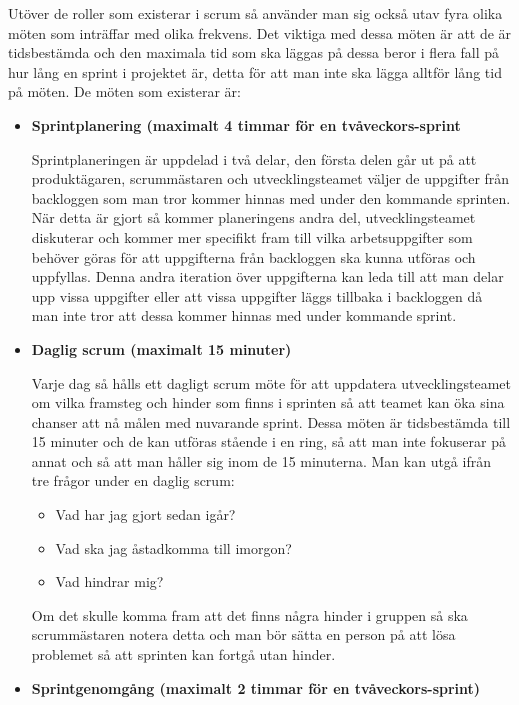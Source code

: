 Utöver de roller som existerar i scrum så använder man sig också utav fyra olika möten som inträffar med olika frekvens. Det viktiga med dessa möten är att de är tidsbestämda och den maximala tid som ska läggas på dessa beror i flera fall på hur lång en sprint i projektet är, detta för att man inte ska lägga alltför lång tid på möten. De möten som existerar är:

\begin{itemize}
	\item \textbf{Sprintplanering (maximalt 4 timmar för en tvåveckors-sprint}
	
	Sprintplaneringen är uppdelad i två delar, den första delen går ut på att produktägaren, scrummästaren och utvecklingsteamet väljer de uppgifter från backloggen som man tror kommer hinnas med under den kommande sprinten. När detta är gjort så kommer planeringens andra del, utvecklingsteamet diskuterar och kommer mer specifikt fram till vilka arbetsuppgifter som behöver göras för att uppgifterna från backloggen ska kunna utföras och uppfyllas. Denna andra iteration över uppgifterna kan leda till att man delar upp vissa uppgifter eller att vissa uppgifter läggs tillbaka i backloggen då man inte tror att dessa kommer hinnas med under kommande sprint.
	
	\item \textbf{Daglig scrum (maximalt 15 minuter)}
	
	Varje dag så hålls ett dagligt scrum möte för att uppdatera utvecklingsteamet om vilka framsteg och hinder som finns i sprinten så att teamet kan öka sina chanser att nå målen med nuvarande sprint. Dessa möten är tidsbestämda till 15 minuter och de kan utföras stående i en ring, så att man inte fokuserar på annat och så att man håller sig inom de 15 minuterna. Man kan utgå ifrån tre frågor under en daglig scrum:
	
	\begin{itemize}
		\item Vad har jag gjort sedan igår?
		\item Vad ska jag åstadkomma till imorgon?
		\item Vad hindrar mig?
	\end{itemize}
	
	Om det skulle komma fram att det finns några hinder i gruppen så ska scrummästaren notera detta och man bör sätta en person på att lösa problemet så att sprinten kan fortgå utan hinder.
	
	\item \textbf{Sprintgenomgång (maximalt 2 timmar för en tvåveckors-sprint)}
	

\end{itemize}
